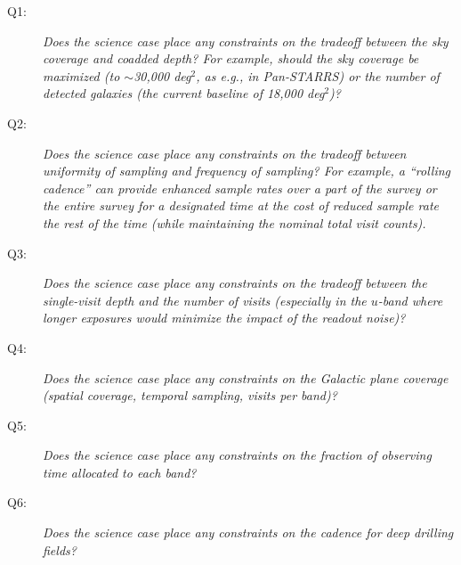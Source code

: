 %
%
%
\begin{description}

\item[Q1:] {\it Does the science case place any constraints on the
tradeoff between the sky coverage and coadded depth? For example, should
the sky coverage be maximized (to $\sim$30,000 deg$^2$, as e.g., in
Pan-STARRS) or the number of detected galaxies (the current baseline of 18,000 deg$^2$)?}


\item[Q2:] {\it Does the science case place any constraints on the
tradeoff between uniformity of sampling and frequency of  sampling? For
example, a ``rolling cadence'' can provide enhanced sample rates over a part
of the survey or the entire survey for a designated time at the cost of
reduced sample rate the rest of the time (while maintaining the nominal
total visit counts).}


\item[Q3:] {\it Does the science case place any constraints on the
tradeoff between the single-visit depth and the number of visits
(especially in the $u$-band where longer exposures would minimize the
impact of the readout noise)?}


\item[Q4:] {\it Does the science case place any constraints on the
Galactic plane coverage (spatial coverage, temporal sampling, visits per
band)?}


\item[Q5:] {\it Does the science case place any constraints on the
fraction of observing time allocated to each band?}


\item[Q6:] {\it Does the science case place any constraints on the
cadence for deep drilling fields?}


\end{description}
